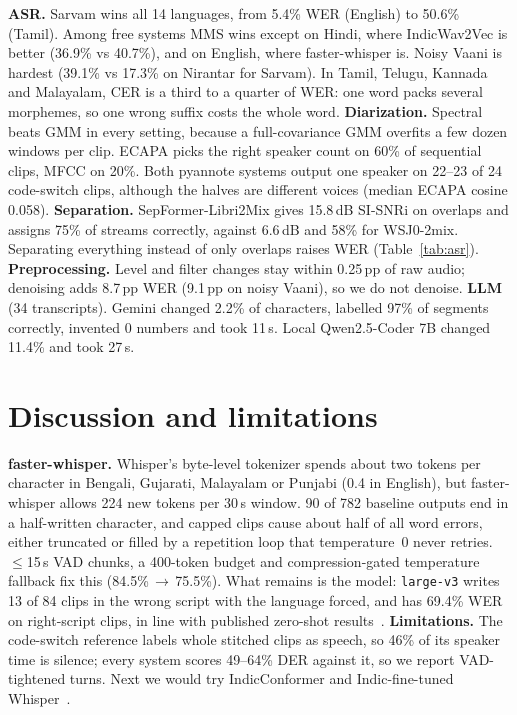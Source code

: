 \documentclass[11pt,a4paper,twocolumn]{article}
\begin{document}
\textbf{ASR.} Sarvam wins all 14 languages, from 5.4\% WER (English) to 50.6\% (Tamil). Among
free systems MMS wins except on Hindi, where IndicWav2Vec is better (36.9\% vs 40.7\%), and on
English, where faster-whisper is. Noisy Vaani is hardest (39.1\% vs 17.3\% on Nirantar for Sarvam). In Tamil, Telugu, Kannada and Malayalam, CER is a third to a quarter of WER: one word
packs several morphemes, so one wrong suffix costs the whole word.
\textbf{Diarization.} Spectral beats GMM in every setting, because a full-covariance GMM overfits
a few dozen windows per clip. ECAPA picks the right speaker count on 60\% of sequential clips,
MFCC on 20\%. Both pyannote systems output one speaker on 22--23 of 24 code-switch clips,
although the halves are different voices (median ECAPA cosine 0.058).
\textbf{Separation.} SepFormer-Libri2Mix gives 15.8\,dB SI-SNRi on overlaps and assigns 75\% of
streams correctly, against 6.6\,dB and 58\% for WSJ0-2mix. Separating everything instead of
only overlaps raises WER (Table~\ref{tab:asr}).
\textbf{Preprocessing.} Level and filter changes stay within 0.25\,pp of raw audio; denoising
adds 8.7\,pp WER (9.1\,pp on noisy Vaani), so we do not denoise.
\textbf{LLM} (34 transcripts). Gemini changed 2.2\% of characters, labelled 97\% of segments
correctly, invented 0 numbers and took 11\,s. Local Qwen2.5-Coder 7B changed 11.4\%
and took 27\,s.

\section{Discussion and limitations}\label{sec:disc}
\textbf{faster-whisper.} Whisper's byte-level tokenizer spends about two tokens per character in
Bengali, Gujarati, Malayalam or Punjabi (0.4 in English), but faster-whisper allows 224 new tokens
per 30\,s window. 90 of 782 baseline outputs end in a half-written character, and capped clips
cause about half of all word errors, either truncated or filled by a repetition loop that
temperature~0 never retries. $\le$15\,s VAD chunks, a 400-token budget and compression-gated
temperature fallback fix this (84.5\%\,$\to$\,75.5\%). What remains is the model:
\texttt{large-v3} writes 13 of 84 clips in the wrong script with the language forced, and has 69.4\% WER on right-script clips, in line with published
zero-shot results~\cite{thennal,vividh}.
\textbf{Limitations.} The code-switch reference labels whole stitched clips as speech, so 46\% of
its speaker time is silence; every system scores 49--64\% DER against it, so we report
VAD-tightened turns. Next we would try IndicConformer and
Indic-fine-tuned Whisper~\cite{vistaar}.
\end{document}
